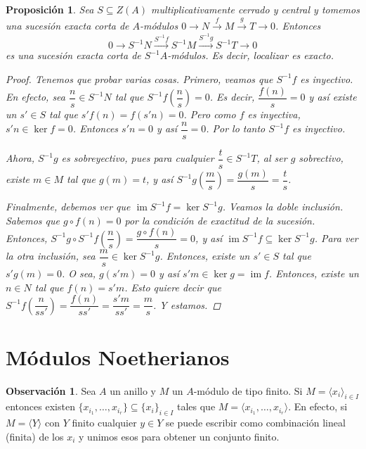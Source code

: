 \documentclass[12pt]{book}
\newtheorem{prop}[teo]{Proposición}
\theoremstyle{definition}
\newtheorem{obs}[teo]{Observación}
\DeclareMathOperator{\im}{im}
\begin{document}
\begin{prop}
Sea $S\subseteq Z(A)$ multiplicativamente cerrado y central y tomemos una sucesión exacta corta de $A$-módulos $0\longrightarrow N\stackrel{f}{\longrightarrow} M\stackrel{g}{\longrightarrow} T\longrightarrow 0$. Entonces $$0\longrightarrow S^{-1}N\stackrel{S^{-1}f}{\longrightarrow} S^{-1}M\stackrel{S^{-1}g}{\longrightarrow}S^{-1}T\longrightarrow 0$$ es una sucesión exacta corta de $S^{-1}A$-módulos. Es decir, localizar es exacto.
\begin{proof}
Tenemos que probar varias cosas. Primero, veamos que $S^{-1}f$ es inyectivo. En efecto, sea $\dfrac{n}{s}\in S^{-1}N$ tal que $S^{-1}f\left(\dfrac{n}{s}\right)=0$. Es decir, $\dfrac{f(n)}{s}=0$ y así existe un $s'\in S$ tal que $s'f(n)=f(s'n)=0$. Pero como $f$ es inyectiva, $s'n\in \ker f =0$. Entonces $s'n=0$ y así $\dfrac{n}{s}=0$. Por lo tanto $S^{-1}f$ es inyectivo.

Ahora, $S^{-1}g$ es sobreyectivo, pues para cualquier $\dfrac{t}{s}\in S^{-1}T$, al ser $g$ sobrectivo, existe $m\in M$ tal que $g(m)=t$, y así $S^{-1}g\left(\dfrac{m}{s}\right) = \dfrac{g(m)}{s} = \dfrac{t}{s}$.

Finalmente, debemos ver que $\im S^{-1}f = \ker S^{-1}g$. Veamos la doble inclusión. Sabemos que $g\circ f(n)=0$ por la condición de exactitud de la sucesión. Entonces, $S^{-1}g\circ S^{-1}f \left(\dfrac{n}{s}\right) = \dfrac{g\circ f(n)}{s} = 0$, y así $\im S^{-1}f\subseteq \ker S^{-1}g$. Para ver la otra inclusión, sea $\dfrac{m}{s}\in \ker S^{-1}g$. Entonces, existe un $s'\in S$ tal que $s'g(m)=0$. O sea, $g(s'm)=0$ y así $s'm\in \ker g =\im f$. Entonces, existe un $n\in N$ tal que $f(n)=s'm$. Esto quiere decir que $S^{-1}f\left(\dfrac{n}{ss'}\right) = \dfrac{f(n)}{ss'} = \dfrac{s'm}{ss'} = \dfrac{m}{s}$. Y estamos.

\end{proof}
\end{prop}

\section{Módulos Noetherianos}

\begin{obs}
Sea $A$ un anillo y $M$ un $A$-módulo de tipo finito. Si $M=\langle x_i\rangle_{i\in I}$ entonces existen $\{x_{i_1},\ldots , x_{i_r}\}\subseteq\{x_i\}_{i\in I}$ tales que $M=\langle x_{i_1},\ldots , x_{i_r}\rangle$. En efecto, si $M=\langle Y\rangle$ con $Y$ finito cualquier $y\in Y$ se puede escribir como combinación lineal (finita) de los $x_i$ y unimos esos para obtener un conjunto finito.
\end{obs}
\end{document}
